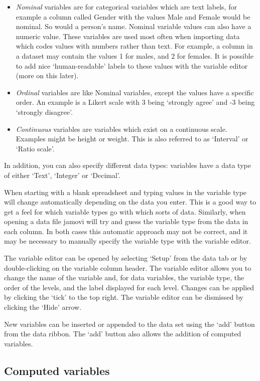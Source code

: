 \documentclass[
]{book}
\providecommand{\tightlist}{%
  \setlength{\itemsep}{0pt}\setlength{\parskip}{0pt}}
\begin{document}
\begin{itemize}
\tightlist
\item
  \emph{Nominal} variables are for categorical variables which are text labels, for example a column called Gender with the values Male and Female would be nominal. So would a person's name. Nominal variable values can also have a numeric value. These variables are used most often when importing data which codes values with numbers rather than text. For example, a column in a dataset may contain the values 1 for males, and 2 for females. It is possible to add nice `human-readable' labels to these values with the variable editor (more on this later).
\item
  \emph{Ordinal} variables are like Nominal variables, except the values have a specific order. An example is a Likert scale with 3 being `strongly agree' and -3 being `strongly disagree'.
\item
  \emph{Continuous} variables are variables which exist on a continuous scale. Examples might be height or weight. This is also referred to as `Interval' or `Ratio scale'.
\end{itemize}

In addition, you can also specify different data types: variables have a data type of either `Text', `Integer' or `Decimal'.

When starting with a blank spreadsheet and typing values in the variable type will change automatically depending on the data you enter. This is a good way to get a feel for which variable types go with which sorts of data. Similarly, when opening a data file jamovi will try and guess the variable type from the data in each column. In both cases this automatic approach may not be correct, and it may be necessary to manually specify the variable type with the variable editor.

The variable editor can be opened by selecting `Setup' from the data tab or by double-clicking on the variable column header. The variable editor allows you to change the name of the variable and, for data variables, the variable type, the order of the levels, and the label displayed for each level. Changes can be applied by clicking the `tick' to the top right. The variable editor can be dismissed by clicking the `Hide' arrow.

New variables can be inserted or appended to the data set using the `add' button from the data ribbon. The `add' button also allows the addition of computed variables.

\hypertarget{computed-variables}{%
\subsection{Computed variables}\label{computed-variables}}
\end{document}
